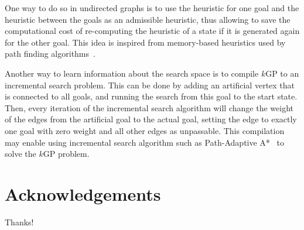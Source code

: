 \documentclass{aicom2e}
\newcommand{\kgs}{$k$GP}
\begin{document}
One way to do so in undirected graphs is to use the heuristic for one goal and the heuristic between the goals as an admissible heuristic, thus allowing to save the computational cost of re-computing the heuristic of a state if it is generated again for the other goal. This idea is inspired from memory-based heuristics used by path finding algorithms~\cite{sturtevant2007memory,sturtevant2009memory,goldenberg2011theCompressed}.

Another way to learn information about the search space is to compile \kgs{} to an incremental search problem. This can be done by adding an artificial vertex that is connected to all goals, and running the search from this goal to the start state. Then, every iteration of the incremental search algorithm will change the weight of the edges from the artificial goal to the actual goal, setting the edge to exactly one goal with zero weight and all other edges as unpassable. This compilation may enable using incremental search algorithm such as Path-Adaptive A*~\cite{hernandez2015reusing} to solve the \kgs{} problem. 






\section*{Acknowledgements}
Thanks!



\end{document}
